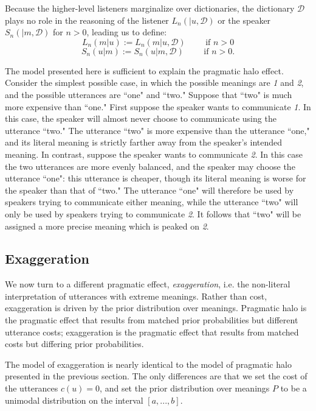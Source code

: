 \documentclass{article} %
\newcommand{\dictionary}{\ensuremath{\mathcal{D}}\xspace}
\begin{document}
Because the higher-level listeners marginalize over dictionaries, the dictionary $\dictionary$ plays no role in the reasoning of the listener $L_n(|u,\dictionary)$ or the speaker $S_n(| m, \dictionary)$ for $n>0$, leading us to define:
\begin{equation}
  L_n(m | u) :=  L_n(m | u, \dictionary) \text{ ~~~~~ if $n > 0$}
\end{equation}
\begin{equation}
  S_n(u | m) :=  S_n(u | m, \dictionary) \text{ ~~~~~ if $n > 0$.}
\end{equation}

The model presented here is sufficient to explain the pragmatic halo effect. Consider the simplest possible case, in which the possible meanings are \emph{1} and \emph{2}, and the possible utterances are ``one" and ``two." Suppose that ``two" is much more expensive than ``one." First suppose the speaker wants to communicate \emph{1}. In this case, the speaker will almost never choose to communicate using the utterance ``two." The utterance ``two" is more expensive than the utterance ``one," and its literal meaning is strictly farther away from the speaker's intended meaning. In contrast, suppose the speaker wants to communicate \emph{2}. In this case the two utterances are more evenly balanced, and the speaker may choose the utterance ``one": this utterance is cheaper, though its literal meaning is worse for the speaker than that of ``two." The utterance ``one" will therefore be used by speakers trying to communicate either meaning, while the utterance ``two" will only be used by speakers trying to communicate \emph{2}. It follows that ``two" will be assigned a more precise meaning which is peaked on \emph{2}. 

\subsection{Exaggeration}

We now turn to a different pragmatic effect, \emph{exaggeration}, i.e. the non-literal interpretation of utterances with extreme meanings. Rather than cost, exaggeration is driven by the prior distribution over meanings. Pragmatic halo is the pragmatic effect that results from matched prior probabilities but different utterance costs; exaggeration is the pragmatic effect that results from matched costs but differing prior probabilities. 

The model of exaggeration is nearly identical to the model of pragmatic halo presented in the previous section. The only differences are that we set the cost of the utterances $c(u)=0$, and set the prior distribution over meanings $P$ to be a unimodal distribution on the interval $[a,...,b]$. 
\end{document}
